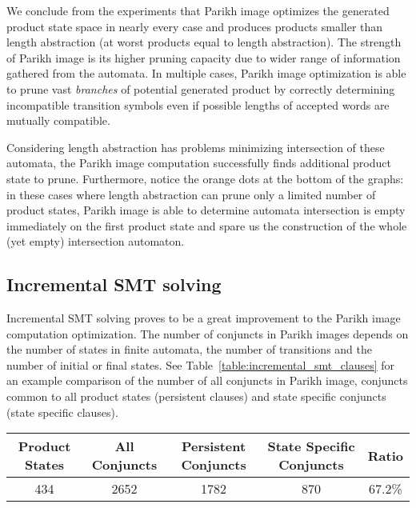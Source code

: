 
We conclude from the experiments that Parikh image optimizes the generated product state space in nearly every case and produces products smaller than length abstraction (at worst products equal to length abstraction). The strength of Parikh image is its higher pruning capacity due to wider range of information gathered from the automata. In multiple cases, Parikh image optimization is able to prune vast \emph{branches} of potential generated product by correctly determining incompatible transition symbols even if possible lengths of accepted words are mutually compatible.

Considering length abstraction has problems minimizing intersection of these automata, the Parikh image computation successfully finds additional product state to prune. Furthermore, notice the orange dots at the bottom of the graphs: in these cases where length abstraction can prune only a limited number of product states, Parikh image is able to determine automata intersection is empty immediately on the first product state and spare us the construction of the whole (yet empty) intersection automaton.

\subsection{Incremental SMT solving}

Incremental SMT solving proves to be a great improvement to the Parikh image computation optimization. The number of conjuncts in Parikh images depends on the number of states in finite automata, the number of transitions and the number of initial or final states. See Table~\ref{table:incremental_smt_clauses} for an example comparison of the number of all conjuncts in Parikh image, conjuncts common to all product states (persistent clauses) and state specific conjuncts (state specific clauses).

\begin{table*}[ht]
	\centering
	\small
    \begin{tabular}{ |c|c|c|c|c| }
        \hline
        Product States & All Conjuncts & Persistent Conjuncts & State Specific Conjuncts & Ratio \\ \hline
        434 & 2652 & 1782 & 870 & 67.2\% \\ \hline
    \end{tabular}
    \caption{An example proportion of persistent and state specific conjuncts in Parikh image computation with incremental SMT solving optimization. \emph{Product States} column shows the number of product states in the whole intersection product, \emph{All Conjuncts} column shows the number of conjuncts in each computed Parikh image, \emph{Persistent Conjuncts} column shows the number of persistent conjuncts in the whole Parikh image (out of the all Parikh image conjuncts), \emph{State Specific Conjuncts} column states how many Parikh image conjuncts have to be recomputed for each product state and \emph{Ratio} column shows the ratio of persistent conjuncts in all Parikh image conjuncts.}
    \label{table:incremental_smt_clauses}
\end{table*}

